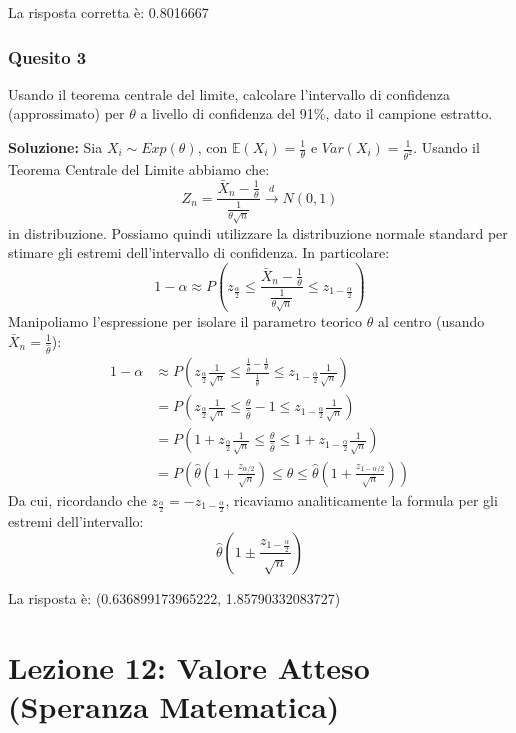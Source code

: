\documentclass[12pt, a4paper]{article}
\begin{document}
La risposta corretta è: 0.8016667

\subsubsection*{Quesito 3}
Usando il teorema centrale del limite, calcolare l’intervallo di confidenza (approssimato) per $\theta$ a livello di confidenza del 91\%, dato il campione estratto.

\textbf{Soluzione:}
Sia $X_i \sim Exp(\theta)$, con $\mathbb{E}(X_i) = \frac{1}{\theta}$ e $Var(X_i) = \frac{1}{\theta^2}$.
Usando il Teorema Centrale del Limite abbiamo che:
$$ Z_n = \frac{\bar{X}_n - \frac{1}{\theta}}{\frac{1}{\theta \sqrt{n}}} \xrightarrow{d} N(0,1) $$
in distribuzione. Possiamo quindi utilizzare la distribuzione normale standard per stimare gli estremi dell’intervallo di confidenza. In particolare:
$$ 1-\alpha \approx P\left( z_{\frac{\alpha}{2}} \leq \frac{\bar{X}_n - \frac{1}{\theta}}{\frac{1}{\theta \sqrt{n}}} \leq z_{1-\frac{\alpha}{2}} \right) $$
Manipoliamo l'espressione per isolare il parametro teorico $\theta$ al centro (usando $\bar{X}_n = \frac{1}{\hat{\theta}}$):
$$ \begin{aligned} 1-\alpha &\approx P\left( z_{\frac{\alpha}{2}} \frac{1}{\sqrt{n}} \leq \frac{\frac{1}{\hat{\theta}} - \frac{1}{\theta}}{\frac{1}{\theta}} \leq z_{1-\frac{\alpha}{2}} \frac{1}{\sqrt{n}} \right) \\ &= P\left( z_{\frac{\alpha}{2}} \frac{1}{\sqrt{n}} \leq \frac{\theta}{\hat{\theta}} - 1 \leq z_{1-\frac{\alpha}{2}} \frac{1}{\sqrt{n}} \right) \\ &= P\left( 1 + z_{\frac{\alpha}{2}} \frac{1}{\sqrt{n}} \leq \frac{\theta}{\hat{\theta}} \leq 1 + z_{1-\frac{\alpha}{2}} \frac{1}{\sqrt{n}} \right) \\ &= P\left( \hat{\theta}\left(1 + \frac{z_{\alpha/2}}{\sqrt{n}}\right) \leq \theta \leq \hat{\theta}\left(1 + \frac{z_{1-\alpha/2}}{\sqrt{n}}\right) \right) \end{aligned} $$
Da cui, ricordando che $z_{\frac{\alpha}{2}} = -z_{1-\frac{\alpha}{2}}$, ricaviamo analiticamente la formula per gli estremi dell'intervallo:
$$ \hat{\theta} \left(1 \pm \frac{z_{1-\frac{\alpha}{2}}}{\sqrt{n}}\right) $$

La risposta è: (0.636899173965222, 1.85790332083727)

\newpage


\section{Lezione 12: Valore Atteso (Speranza Matematica)}
\end{document}
